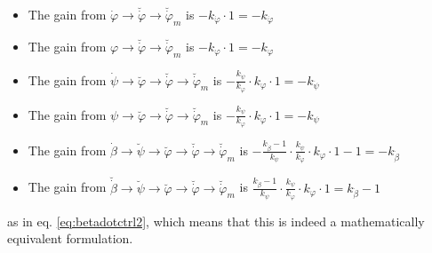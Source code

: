 \documentclass{article}
\begin{document}
\begin{itemize}
	\item The gain from $\dot{\varphi} \rightarrow \breve{\dot{\varphi}} \rightarrow \breve{\dot{\varphi}}_m$ is $-k_{\dot{\varphi}} \cdot 1 = -k_{\dot{\varphi}}$
	\item The gain from $\varphi \rightarrow \breve{\dot{\varphi}} \rightarrow \breve{\dot{\varphi}}_m$ is $-k_{\varphi} \cdot 1 = -k_{\varphi}$
	\item The gain from $\dot{\psi} \rightarrow \breve{\varphi} \rightarrow \breve{\dot{\varphi}} \rightarrow \breve{\dot{\varphi}}_m$ is $-\frac{k_{\dot{\psi}}}{k_{\varphi}} \cdot k_{\varphi} \cdot 1 = -k_{\dot{\psi}}$
	\item The gain from $\psi \rightarrow \breve{\varphi} \rightarrow \breve{\dot{\varphi}} \rightarrow \breve{\dot{\varphi}}_m$ is $-\frac{k_{\psi}}{k_{\varphi}} \cdot k_{\varphi} \cdot 1 = -k_{\psi}$
	\item The gain from $\dot{\beta} \rightarrow \breve{\psi} \rightarrow \breve{\varphi} \rightarrow \breve{\dot{\varphi}} \rightarrow \breve{\dot{\varphi}}_m$ is $-\frac{k_{\dot{\beta}} - 1}{k_{\psi}} \cdot \frac{k_{\psi}}{k_{\varphi}} \cdot k_{\varphi} \cdot 1 - 1 = -k_{\dot{\beta}}$
  \item The gain from $\breve{\dot{\beta}} \rightarrow \breve{\psi} \rightarrow \breve{\varphi} \rightarrow \breve{\dot{\varphi}} \rightarrow \breve{\dot{\varphi}}_m$ is $\frac{k_{\dot{\beta}} - 1}{k_{\psi}} \cdot \frac{k_{\psi}}{k_{\varphi}} \cdot k_{\varphi} \cdot 1= k_{\dot{\beta}} - 1$
\end{itemize}
as in eq. \ref{eq:betadotctrl2}, which means that this is indeed a mathematically equivalent formulation.
\end{document}
